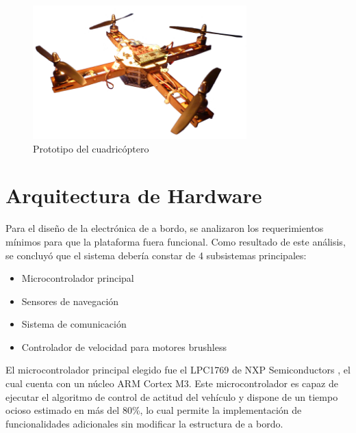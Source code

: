 \documentclass[a4paper, conference]{IEEEtran}
\begin{document}
\begin{figure}[!t]
\centering
\includegraphics[width=3.25in]{foto_quad.png}
\caption{Prototipo del cuadricóptero}
\label{ref:quadfoto}
\end{figure}

\vspace{5 mm}

\section{Arquitectura de Hardware}

Para el diseño de la electrónica de a bordo, se analizaron los requerimientos mínimos para que la plataforma fuera funcional. Como resultado de este análisis, se concluyó que el sistema debería constar de 4 subsistemas principales: 
\begin{itemize}
\item Microcontrolador principal
\item Sensores de navegación 
\item Sistema de comunicación
\item Controlador de velocidad para motores brushless
\end{itemize}
	
El microcontrolador principal elegido fue el LPC1769 de NXP Semiconductors \cite{lpc1769}, el cual cuenta con un núcleo ARM Cortex M3.  Este microcontrolador es capaz de ejecutar el algoritmo de control de actitud del vehículo y dispone de un tiempo ocioso estimado en más del 80\%, lo cual permite la implementación de funcionalidades adicionales sin modificar la estructura de a bordo.
\end{document}
